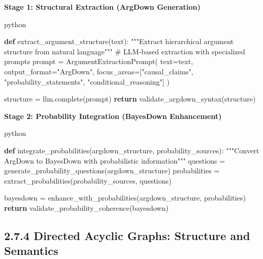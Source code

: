 \documentclass[
  11pt,
  letterpaper,
]{book}
\newenvironment{Shaded}{\begin{snugshade}}{\end{snugshade}}
\newcommand{\CommentTok}[1]{\textcolor[rgb]{0.37,0.37,0.37}{#1}}
\newcommand{\ControlFlowTok}[1]{\textcolor[rgb]{0.00,0.23,0.31}{\textbf{#1}}}
\newcommand{\KeywordTok}[1]{\textcolor[rgb]{0.00,0.23,0.31}{\textbf{#1}}}
\newcommand{\NormalTok}[1]{\textcolor[rgb]{0.00,0.23,0.31}{#1}}
\newcommand{\OperatorTok}[1]{\textcolor[rgb]{0.37,0.37,0.37}{#1}}
\newcommand{\StringTok}[1]{\textcolor[rgb]{0.13,0.47,0.30}{#1}}
\begin{document}
\textbf{Stage 1: Structural Extraction (ArgDown Generation)}

python

\begin{Shaded}
\begin{Highlighting}[]
\KeywordTok{def}\NormalTok{ extract\_argument\_structure(text):}
    \CommentTok{"""Extract hierarchical argument structure from natural language"""}
    \CommentTok{\# LLM{-}based extraction with specialized prompts}
\NormalTok{    prompt }\OperatorTok{=}\NormalTok{ ArgumentExtractionPrompt(}
\NormalTok{        text}\OperatorTok{=}\NormalTok{text,}
\NormalTok{        output\_format}\OperatorTok{=}\StringTok{"ArgDown"}\NormalTok{,}
\NormalTok{        focus\_areas}\OperatorTok{=}\NormalTok{[}\StringTok{"causal\_claims"}\NormalTok{, }\StringTok{"probability\_statements"}\NormalTok{, }\StringTok{"conditional\_reasoning"}\NormalTok{]}
\NormalTok{    )}
    
\NormalTok{    structure }\OperatorTok{=}\NormalTok{ llm.complete(prompt)}
    \ControlFlowTok{return}\NormalTok{ validate\_argdown\_syntax(structure)}
\end{Highlighting}
\end{Shaded}

\textbf{Stage 2: Probability Integration (BayesDown Enhancement)}

python

\begin{Shaded}
\begin{Highlighting}[]
\KeywordTok{def}\NormalTok{ integrate\_probabilities(argdown\_structure, probability\_sources):}
    \CommentTok{"""Convert ArgDown to BayesDown with probabilistic information"""}
\NormalTok{    questions }\OperatorTok{=}\NormalTok{ generate\_probability\_questions(argdown\_structure)}
\NormalTok{    probabilities }\OperatorTok{=}\NormalTok{ extract\_probabilities(probability\_sources, questions)}
    
\NormalTok{    bayesdown }\OperatorTok{=}\NormalTok{ enhance\_with\_probabilities(argdown\_structure, probabilities)}
    \ControlFlowTok{return}\NormalTok{ validate\_probability\_coherence(bayesdown)}
\end{Highlighting}
\end{Shaded}

\subsection*{2.7.4 Directed Acyclic Graphs: Structure and
Semantics}\label{sec-dag-structure}
\end{document}
